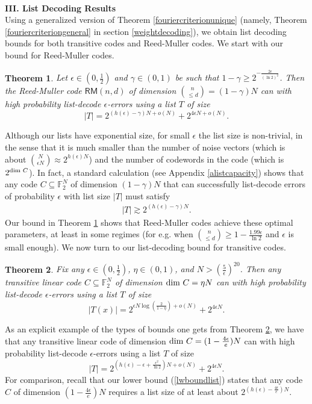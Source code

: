 \documentclass[12pt]{article}
\newtheorem{theorem}{Theorem}
\newcommand{\F}{\mathbb{F}}
\begin{document}
\hfill\\
\textbf{III. List Decoding Results}
\hfill\\
Using a generalized version of Theorem \ref{fouriercriterionunique} (namely, Theorem \ref{fouriercriteriongeneral} in section \ref{weightdecoding}), we obtain list decoding bounds for both transitive codes and Reed-Muller codes. We start with our bound for Reed-Muller codes. 
\begin{theorem}\label{rmclose}
Let $\epsilon\in(0,\frac{1}{2})$ and $\gamma\in(0,1)$ be such that $1-\gamma\geq 2^{-\frac{2\epsilon}{(\ln2)^2}}$. Then the Reed-Muller code $\mathsf{RM}(n,d)$ of dimension $\binom{n}{\leq d}=(1-\gamma)N$ can with high probability list-decode $\epsilon$-errors using a list $T$ of size
     $$|T|=2^{(h(\epsilon)-\gamma)N+o(N)}+2^{4\epsilon N+o(N)} .$$
\end{theorem}
Although our lists have exponential size, for small $\epsilon$ the list size is non-trivial, in the sense that it is much smaller than the number of noise vectors (which is about $\binom{N}{\epsilon N}\approx2^{h(\epsilon)N}$) and the number of codewords in the code (which is $2^{\textnormal{dim }C}$). In fact, a standard calculation (see Appendix \ref{alistcapacity}) shows that any code $C\subseteq\F_2^N$ of dimension $(1-\gamma)N$ that can successfully list-decode errors of probability $\epsilon$ with list size $|T|$ must satisfy
\begin{align}\label{lwboundlist}
|T|\gtrsim 2^{(h(\epsilon)-\gamma)N}.
\end{align}
Our bound in Theorem \ref{rmclose} shows that Reed-Muller codes achieve these optimal parameters, at least in some regimes (for e.g. when $\binom{n}{\leq d}\geq 1-\frac{1.99\epsilon}{\ln2}$ and $\epsilon$ is small enough). 
We now turn to our list-decoding bound for transitive codes.
\begin{theorem}\label{thmtransitivelist}
Fix any $\epsilon\in(0,\frac{1}{2})$, $\eta\in(0,1)$, and $N> \left(\frac{5}{\epsilon}\right)^{20}$. Then any  transitive linear code $C\subseteq\F_2^N$ of dimension $\textnormal{dim }C=\eta N$ can with high probability list-decode $\epsilon$-errors using a list $T$ of size
$$|T(x)|=2^{\epsilon N\log(\frac{2}{1-\eta})+o(N)}+2^{4\epsilon N}.$$\end{theorem}
As an explicit example of the types of bounds one gets from Theorem \ref{thmtransitivelist}, we have that any transitive linear code of dimension $\textnormal{dim }C=(1-\frac{4\epsilon}{e})N$
can with high probability list-decode $\epsilon$-errors using a list $T$ of size
$$|T|= 2^{(h(\epsilon) -\epsilon +\frac{\epsilon^2}{\ln2} )N+o(N)}+2^{4\epsilon N}.$$
For comparison, recall that our lower bound (\ref{lwboundlist}) states that any code $C$ of dimension $(1-\frac{4\epsilon}{e})N$ requires a list size of at least about $ 2^{(h(\epsilon)-\frac{4\epsilon}{e})N}$.
\end{document}
